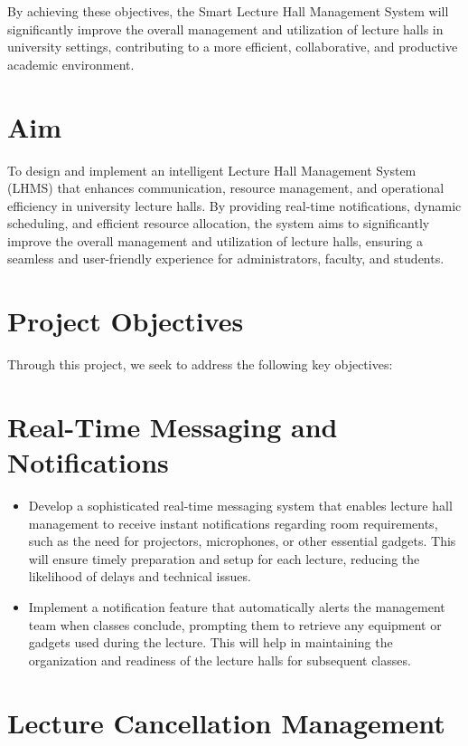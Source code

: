 \documentclass[12pt]{article}
\begin{document}
By achieving these objectives, the Smart Lecture Hall Management System will significantly improve the overall management and utilization of lecture halls in university settings, contributing to a more efficient, collaborative, and productive academic environment.

\section*{Aim}

To design and implement an intelligent Lecture Hall Management System (LHMS) that enhances communication, resource management, and operational efficiency in university lecture halls. By providing real-time notifications, dynamic scheduling, and efficient resource allocation, the system aims to significantly improve the overall management and utilization of lecture halls, ensuring a seamless and user-friendly experience for administrators, faculty, and students.

\section*{Project Objectives}

Through this project, we seek to address the following key objectives:
\section*{Real-Time Messaging and Notifications}

\begin{itemize}
    \item Develop a sophisticated real-time messaging system that enables lecture hall management to receive instant notifications regarding room requirements, such as the need for projectors, microphones, or other essential gadgets. This will ensure timely preparation and setup for each lecture, reducing the likelihood of delays and technical issues.
    \item Implement a notification feature that automatically alerts the management team when classes conclude, prompting them to retrieve any equipment or gadgets used during the lecture. This will help in maintaining the organization and readiness of the lecture halls for subsequent classes.
\end{itemize}

\section*{Lecture Cancellation Management}
\end{document}
